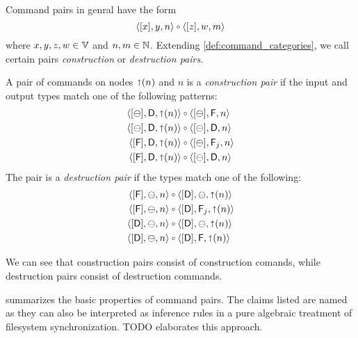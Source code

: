 \myskip
Command pairs in genral have the form
\[ \cxynv\cc  \czwmv \]
where $x,y,z,w\in\mathbb{V}$ and $n,m\in\mathbb{N}$. 
Extending \cref{def:command_categories}, we call certain pairs
\emph{construction} or \emph{destruction pairs}.

\begin{mydef}
A pair of commands on nodes $\mathord{\shortuparrow}({n})$ and $n$
is a \emph{construction pair} if the input and output types match
one of the following patterns:
   \begin{align*}
            \cbda{\pn}&\cc  \cbfa{n} \\
            \cbda{\pn}&\cc  \cbda{n} \\
            \cfda{\pn}&\cc  \caaa{\empt}{\valff}{n} \\
            \cfda{\pn}&\cc  \cbda{n}
   \end{align*}
The pair is a \emph{destruction pair} if the types match one of the following:
   \begin{align*}
            \cfba{n}&\cc  \cdba{\pn} \\
            \cfba{n}&\cc  \caaa{\vald}{\valff}{\pn} \\
            \cdba{n}&\cc  \cdba{\pn} \\
            \cdba{n}&\cc  \cdfa{\pn}
   \end{align*}
\end{mydef}

We can see that construction pairs consist of construction comands,
while destruction pairs consist of destruction commands.




 summarizes the basic properties of command pairs.
The claims listed are named \emph{}
as they can also be interpreted as inference rules in a pure
algebraic treatment of filesystem synchronization.
TODO elaborates this approach.


